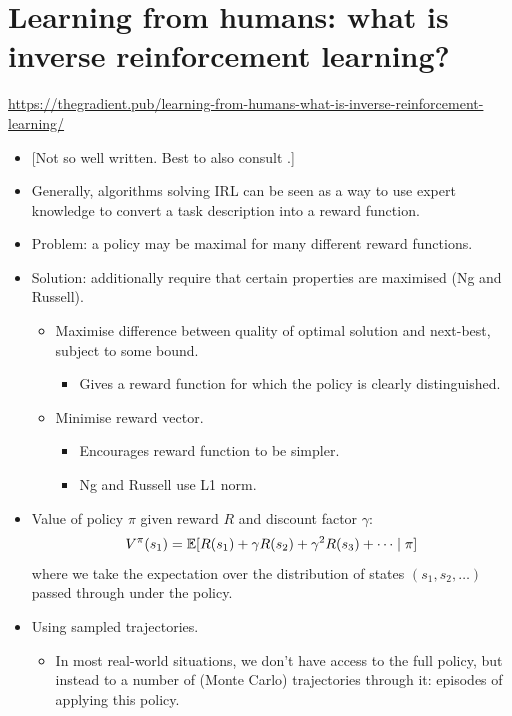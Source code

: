 \section{Learning from humans: what is inverse reinforcement learning?}

\url{https://thegradient.pub/learning-from-humans-what-is-inverse-reinforcement-learning/}

\begin{itemize}
    \item {[}Not so well written. Best to also consult \cite{ng2000algorithms}.]
    \item Generally, algorithms solving IRL can be seen as a way to use expert knowledge to convert a task description into a reward function.
    \item Problem: a policy may be maximal for many different reward functions.
    \item Solution: additionally require that certain properties are maximised (Ng and Russell).
    \begin{itemize}
        \item Maximise difference between quality of optimal solution and next-best, subject to some bound.
        \begin{itemize}
            \item Gives a reward function for which the policy is clearly distinguished.
        \end{itemize}
        \item Minimise reward vector.
        \begin{itemize}
            \item Encourages reward function to be simpler.
            \item Ng and Russell use L1 norm.
        \end{itemize}
    \end{itemize}
    \item Value of policy $\pi$ given reward $R$ and discount factor $\gamma$:
    \begin{equation*}
        V^\pi(s_1) = \mathbb E[R(s_1) + \gamma R(s_2) + \gamma^2 R(s_3) + \cdots \mid \pi]
    \end{equation*}
    where we take the expectation over the distribution of states $(s_1, s_2, \ldots)$ passed through under the policy.
    \item Using sampled trajectories.
    \begin{itemize}
        \item In most real-world situations, we don't have access to the full policy, but instead to a number of (Monte Carlo) trajectories through it: episodes of applying this policy.

\end{itemize}
\end{itemize}
